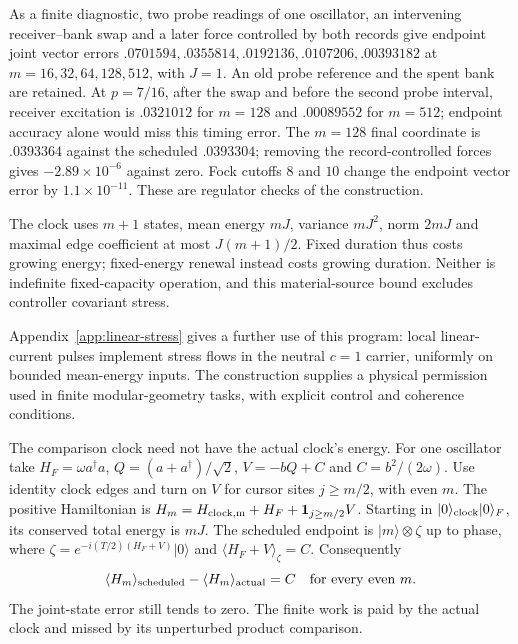 As a finite diagnostic, two probe readings of one oscillator, an
intervening receiver--bank swap and a later force controlled by both
records give endpoint joint vector errors $.0701594,.0355814,
.0192136,.0107206,.00393182$ at $m=16,32,64,128,512$, with
$J=1$. An old probe reference and the spent bank are retained.
At $p=7/16$, after the swap and before the second probe interval,
receiver excitation is $.0321012$ for $m=128$ and $.00089552$ for
$m=512$; endpoint accuracy alone would miss this timing error.
The $m=128$ final coordinate is $.0393364$ against the scheduled
$.0393304$; removing the record-controlled forces gives
$-2.89\times10^{-6}$ against zero. Fock cutoffs $8$ and $10$
change the endpoint vector error by $1.1\times10^{-11}$.
These are regulator checks of the construction.

The clock uses $m+1$ states, mean energy $mJ$, variance $mJ^2$,
norm $2mJ$ and maximal edge coefficient at most $J(m+1)/2$.
Fixed duration thus costs growing energy; fixed-energy renewal instead
costs growing duration. Neither is indefinite fixed-capacity operation,
and this material-source bound excludes controller covariant stress.

Appendix~\ref{app:linear-stress} gives a further use of this program:
local linear-current pulses implement stress flows in the neutral
$c=1$ carrier, uniformly on bounded mean-energy inputs. The construction
supplies a physical permission used in finite modular-geometry tasks,
with explicit control and coherence conditions.

The comparison clock need not have the actual clock's energy.
For one oscillator take $H_F=\omega a^\dagger a$,
$Q=(a+a^\dagger)/\sqrt2$, $V=-bQ+C$ and $C=b^2/(2\omega)$.
Use identity clock edges and turn on $V$ for cursor sites $j\ge m/2$,
with even $m$. The positive Hamiltonian is
$H_m=H_{\rm clock,m}+H_F+\mathbf1_{j\ge m/2}V$.
Starting in $|0\rangle_{\rm clock}|0\rangle_F$, its conserved total
energy is $mJ$. The scheduled endpoint is
$|m\rangle\otimes\zeta$ up to phase, where
$\zeta=e^{-i(T/2)(H_F+V)}|0\rangle$ and
$\langle H_F+V\rangle_\zeta=C$. Consequently
\begin{equation}
 \langle H_m\rangle_{\rm scheduled}-
 \langle H_m\rangle_{\rm actual}=C
 \quad\text{for every even }m.
 \label{eq:clock-work-defect}
\end{equation}
The joint-state error still tends to zero. The finite work is paid
by the actual clock and missed by its unperturbed product comparison.

